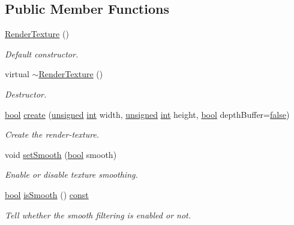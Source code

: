 \subsection*{Public Member Functions}
\begin{DoxyCompactItemize}
\item 
\hyperlink{classsf_1_1_render_texture_a19ee6e5b4c40ad251803389b3953a9c6}{Render\-Texture} ()
\begin{DoxyCompactList}\small\item\em Default constructor. \end{DoxyCompactList}\item 
virtual \hyperlink{classsf_1_1_render_texture_a94b84ab9335be84d2a014c964d973304}{$\sim$\-Render\-Texture} ()
\begin{DoxyCompactList}\small\item\em Destructor. \end{DoxyCompactList}\item 
\hyperlink{term__entry_8h_a002004ba5d663f149f6c38064926abac}{bool} \hyperlink{classsf_1_1_render_texture_aefbb76eb3b87e368ab974b2660931ccb}{create} (\hyperlink{curses_8priv_8h_aca40206900cfc164654362fa8d4ad1e6}{unsigned} \hyperlink{term__entry_8h_ad65b480f8c8270356b45a9890f6499ae}{int} width, \hyperlink{curses_8priv_8h_aca40206900cfc164654362fa8d4ad1e6}{unsigned} \hyperlink{term__entry_8h_ad65b480f8c8270356b45a9890f6499ae}{int} height, \hyperlink{term__entry_8h_a002004ba5d663f149f6c38064926abac}{bool} depth\-Buffer=\hyperlink{_snake_8cpp_ae6c865df784842196d411c1466b01686}{false})
\begin{DoxyCompactList}\small\item\em Create the render-\/texture. \end{DoxyCompactList}\item 
void \hyperlink{classsf_1_1_render_texture_af08991e63c6020865dd07b20e27305b6}{set\-Smooth} (\hyperlink{term__entry_8h_a002004ba5d663f149f6c38064926abac}{bool} smooth)
\begin{DoxyCompactList}\small\item\em Enable or disable texture smoothing. \end{DoxyCompactList}\item 
\hyperlink{term__entry_8h_a002004ba5d663f149f6c38064926abac}{bool} \hyperlink{classsf_1_1_render_texture_ae385f4f4dbd2af50fb11947bf0bcb83d}{is\-Smooth} () \hyperlink{term__entry_8h_a57bd63ce7f9a353488880e3de6692d5a}{const} 
\begin{DoxyCompactList}\small\item\em Tell whether the smooth filtering is enabled or not. \end{DoxyCompactList}\item 

\end{DoxyCompactItemize}
